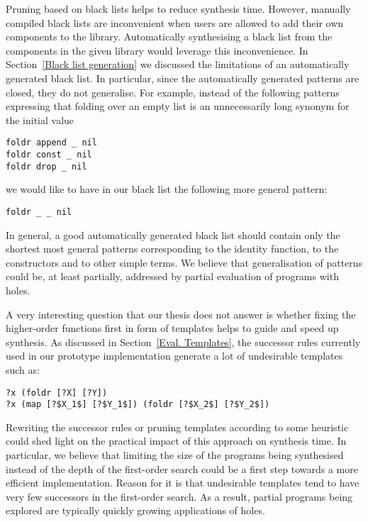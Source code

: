 Pruning based on black lists helps to reduce synthesis time. However, manually compiled black lists are inconvenient when users are allowed to add their own components to the library. Automatically synthesising a black list from the components in the given library would leverage this inconvenience. In Section~\ref{Black list generation} we discussed the limitations of an automatically generated black list. In particular, since the automatically generated patterns are closed, they do not generalise. For example, instead of the following patterns expressing that folding over an empty list is an unnecessarily long synonym for the initial value
\begin{lstlisting}[style=plain]
foldr append _ nil
foldr const _ nil
foldr drop _ nil
\end{lstlisting}
we would like to have in our black list the following more general pattern:
\begin{lstlisting}[style=plain]
foldr _ _ nil
\end{lstlisting}
In general, a good automatically generated black list should contain only the shortest most general patterns corresponding to the identity function, to the constructors and to other simple terms.
We believe that generalisation of patterns could be, at least partially, addressed by partial evaluation of programs with holes.

A very interesting question that our thesis does not answer is whether fixing the higher-order functions first in form of templates helps to guide and speed up synthesis. As discussed in Section~\ref{Eval. Templates}, the successor rules currently used in our prototype implementation generate a lot of undesirable templates such as:
\begin{lstlisting}[style=plain]
?x (foldr [?X] [?Y])
?x (map [?$X_1$] [?$Y_1$]) (foldr [?$X_2$] [?$Y_2$])
\end{lstlisting}
Rewriting the successor rules or pruning templates according to some heuristic could shed light on the practical impact of this approach on synthesis time. In particular, we believe that limiting the size of the programs being synthesised instead of the depth of the first-order search could be a first step towards a more efficient implementation. Reason for it is that undesirable templates tend to have very few successors in the first-order search. As a result, partial programs being explored are typically quickly growing applications of holes.

